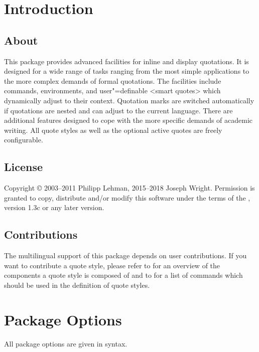 \documentclass{ltxdockit}[2010/09/26]
\begin{document}
\printtitlepage
\tableofcontents
\listoftables

\section{Introduction}
\label{int}

\subsection[About]{About }

This package provides advanced facilities for inline and display quotations. It is designed for a wide range of tasks ranging from the most simple applications to the more complex demands of formal quotations. The facilities include commands, environments, and user"=definable <smart quotes> which dynamically adjust to their context. Quotation marks are switched automatically if quotations are nested and can adjust to the current language. There are additional features designed to cope with the more specific demands of academic writing. All quote styles as well as the optional active quotes are freely configurable.

\subsection{License}

Copyright © 2003--2011 Philipp Lehman, 2015--2018 Joseph Wright. Permission is granted to copy, distribute and\slash or modify this software under the terms of the \lppl, version 1.3c or any later version.

\subsection{Contributions}

The multilingual support of this package depends on user contributions. If you want to contribute a quote style, please refer to  for an overview of the components a quote style is composed of and to  for a list of commands which should be used in the definition of quote styles.

\section{Package Options}
\label{opt}

All package options are given in \keyval syntax.
\end{document}
